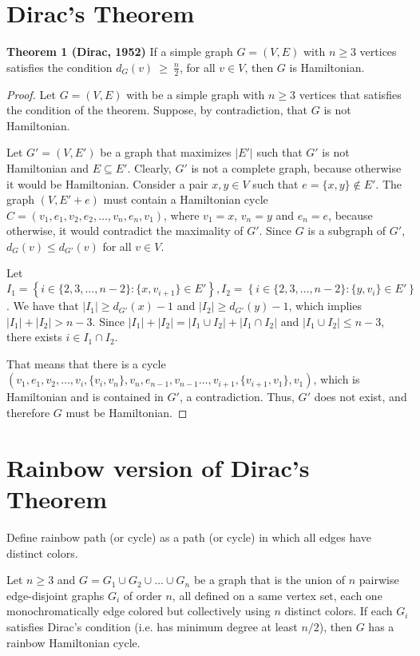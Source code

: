 \section{Dirac's Theorem}

\textbf{Theorem 1 (Dirac, 1952)} If a simple graph $G = (V, E)$ with $n \geq 3$ vertices satisfies the condition $d_G(v)~\geq~\frac{n}{2}$, for all $v \in V$, 
then $G$ is Hamiltonian.

\begin{proof}
    Let $G = (V, E)$ with be a simple graph with $n \geq 3$ vertices that satisfies the condition of the theorem. Suppose, 
    by contradiction, that $G$ is not Hamiltonian. 

    Let $G' = (V, E')$ be a graph that maximizes $|E'|$ such that $G'$ is not Hamiltonian and $E \subseteq E'$. 
    Clearly, $G'$ is not a complete graph, because otherwise it would be Hamiltonian. Consider a pair $x, y \in V$ such that 
    $e = \{x, y\} \not\in E'$.
    The graph $(V, E' + e)$ must contain a Hamiltonian cycle $C = (v_1, e_1, v_2, e_2, \ldots, v_n, e_{n}, v_1)$, where 
    $v_1 = x$, $v_n = y$ and $e_n = e$, because otherwise, it would contradict the maximality of $G'$.
    Since $G$ is a subgraph of $G'$, $d_G(v) \leq d_{G'}(v)$ for all $v \in V$.

    Let $I_1 = \left\{i \in \{2, 3, \dots, n-2\} : \{x, v_{i+1}\} \in E'\right\}, 
    I_2 = \left\{ i \in \{2, 3, \dots, n - 2\} : \{y, v_{i}\} \in E' \right\}$.
    We have that $|I_1| \geq d_{G'}(x) - 1$ and $|I_2| \geq d_{G'}(y) - 1$,
    which implies $|I_1| + |I_2| > n - 3$. 
    Since $|I_1| + |I_2| = |I_1 \cup I_2| + |I_1 \cap I_2|$ and $|I_1 \cup I_2| \leq n - 3$, 
    there exists $i \in I_1 \cap I_2$.

    That means that there is a cycle 
    $(v_1, e_1, v_2, \dots, v_i, \{v_i, v_n\}, v_n, e_{n - 1}, v_{n-1} \dots , v_{i+1}, \{v_{i+1}, v_1\}, v_1)$, 
    which is Hamiltonian and is contained in $G'$, a contradiction. Thus, $G'$ does not exist,
    and therefore $G$ must be Hamiltonian.

\end{proof}

\section{Rainbow version of Dirac's Theorem}

Define rainbow path (or cycle) as a path (or cycle) in which all edges have distinct colors.

Let $n\geq 3$ and $G = G_1 \cup G_2 \cup \ldots \cup
G_n$ be a graph that is the union of $n$ pairwise edge-disjoint graphs
$G_i$ of order $n$, all defined on a same vertex set, each one
monochromatically edge colored but collectively using $n$ distinct
colors. If each $G_i$ satisfies Dirac's condition (i.e. has minimum 
degree at least $n/2$), then $G$ has a rainbow Hamiltonian cycle.
